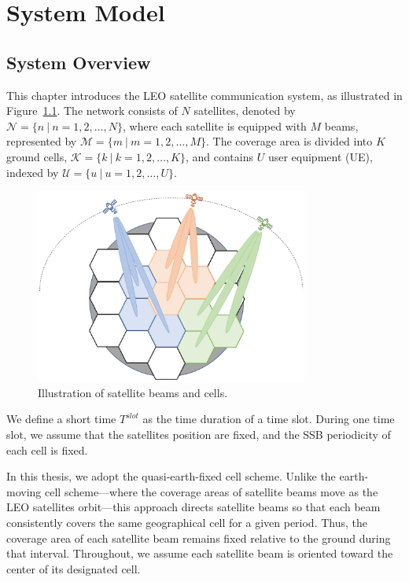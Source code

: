 \chapter{System Model}
\label{chap:model}
\section{System Overview}

This chapter introduces the LEO satellite communication system, as illustrated in Figure~\ref{fig_system}. The network consists of $N$ satellites, denoted by $\mathcal{N} = \{n\ |\ n = 1, 2, \ldots, N\}$, where each satellite is equipped with $M$ beams, represented by $\mathcal{M} = \{m\ |\ m = 1, 2, \ldots, M\}$. The coverage area is divided into $K$ ground cells, $\mathcal{K} = \{k\ |\ k = 1, 2, \ldots, K\}$, and contains $U$ user equipment (UE), indexed by $\mathcal{U} = \{u\ |\ u = 1, 2, \ldots, U\}$.

\begin{figure}[h!]
    \centering
    \includegraphics[width=0.8\textwidth]{figure/system overview.pdf}
    \caption{Illustration of satellite beams and cells.}
    \label{fig_system}
\end{figure}

We define a short time $T^{slot}$ as the time duration of a time slot. During one time slot, we assume that the satellites position are fixed, and the SSB periodicity of each cell is fixed. 

In this thesis, we adopt the quasi-earth-fixed cell scheme. Unlike the earth-moving cell scheme—where the coverage areas of satellite beams move as the LEO satellites orbit—this approach directs satellite beams so that each beam consistently covers the same geographical cell for a given period. Thus, the coverage area of each satellite beam remains fixed relative to the ground during that interval. Throughout, we assume each satellite beam is oriented toward the center of its designated cell.

